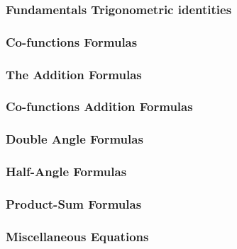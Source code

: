 

\subsubsection{Fundamentals Trigonometric identities}



\subsubsection{Co-functions Formulas}



\subsubsection{The Addition Formulas}



\subsubsection{Co-functions Addition Formulas}

\subsubsection{Double Angle Formulas}

\subsubsection{Half-Angle Formulas}

\subsubsection{Product-Sum Formulas}

\subsubsection{Miscellaneous Equations}


